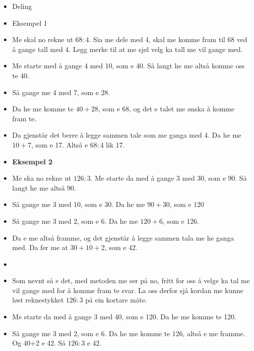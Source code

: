 


\begin{itemize}
	\item Deling
	\item Eksempel 1
	\item Me skal no rekne ut $ 68:4 $. Sia me dele med 4, skal me komme fram til 68 ved å gange tall med 4. Legg merke til at me sjøl velg ka tall me vil gange med.
	\item Me starte med å gange 4 med 10, som e 40. Så langt he me altså komme oss te 40. 
	\item Så gange me 4 med 7, som e 28. 
	\item Da he me komme te $40+28 $, som e 68, og det e talet me ønska å komme fram te.
	\item Da gjenstår det berre å legge sammen tale som me ganga med 4. Da he me $ 10+7 $, som e 17. Altså e $ 68:4 $ lik 17.
\end{itemize}
\begin{itemize}
	\item \textbf{Eksempel 2}
	\item Me ska no rekne ut $ 126:3 $. Me starte da med å gange 3 med 30, som e 90. Så langt he me altså 90.
	\item Så gange me 3 med 10, som e 30. Da he me $ 90+30 $, som e 120
	\item Så gange me 3 med 2, som e 6. Da he me $ 120+6 $, som e 126. 
	\item Da e me altså framme, og det gjenstår å legge sammen tala me he ganga med. Da fer me at $ 30+10+2 $, som e 42.
	\item 
	\item Som nevnt så e det, med metoden me ser på no, fritt for oss å velge ka tal me vil gange med for å komme fram te svar. La oss derfor sjå kordan me kunne løst reknestykket $ 126:3 $ på ein kortare måte.
	\item Me starte da med å gange 3 med 40, som e 120. Da he me komme te 120.
	\item Så gange me 3 med 2, som e 6. Da he me komme te 126, altså e me framme. Og 40+2 e 42. Så $ 126:3 $ e 42.
\end{itemize}
